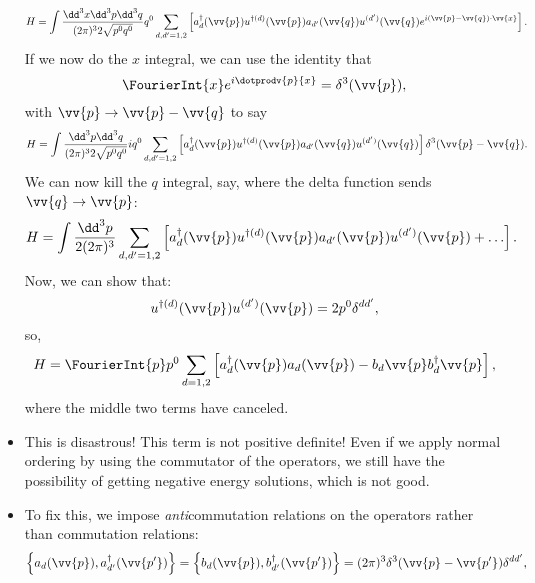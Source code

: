 \begin{itemize}
            \begin{equation*}
                H = \int\frac{\dd^3x\dd^3p\dd^3q}{(2\pi)^3 2\sqrt{p^0q^0}} q^0 \sum_{d,d'=1,2} \left[ a_d^{\dagger}(\vv{p})u^{\dagger(d)}(\vv{p}) a_{d'}(\vv{q})u^{(d')}(\vv{q})e^{i(\vv{p}-\vv{q})\cdot\vv{x}} \right].
            \end{equation*}
            If we now do the $x$ integral, we can use the identity that
            \begin{equation*}
                \FourierInt{x} e^{i\dotprodv{p}{x}} = \delta^3(\vv{p}),
            \end{equation*}
            with $\vv{p} \rightarrow \vv{p}-\vv{q}$ to say
            \begin{equation*}
                H = \int \frac{\dd^3p\dd^3q}{(2\pi)^3 2\sqrt{p^0q^0}} iq^0 \sum_{d,d'=1,2} \left[ a_d^{\dagger}(\vv{p})u^{\dagger(d)}(\vv{p})a_{d'}(\vv{q})u^{(d')}(\vv{q}) \right]\delta^3(\vv{p}-\vv{q}).
            \end{equation*}
            We can now kill the $q$ integral, say, where the delta function sends $\vv{q} \rightarrow \vv{p}$:
            \begin{equation*}
                H = \int \frac{\dd^3p}{2(2\pi)^3} \sum_{d,d'=1,2} \left[ a_d^{\dagger}(\vv{p})u^{\dagger(d)}(\vv{p})a_{d'}(\vv{p})u^{(d')}(\vv{p}) + \ldots \right].
            \end{equation*}
            Now, we can show that:
            \begin{equation*}
                u^{\dagger(d)}(\vv{p}) u^{(d')}(\vv{p}) = 2p^0\delta^{dd'},
            \end{equation*}
            so,
            \begin{equation*}
                H = \FourierInt{p} p^0 \sum_{d=1,2} \left[ a^{\dagger}_d(\vv{p})a_d(\vv{p}) - b_d{\vv{p}}b^{\dagger}_d{\vv{p}} \right],
            \end{equation*}
            where the middle two terms have canceled.
        \item This is disastrous! This term is not positive definite! Even if we apply normal ordering by using the commutator of the operators, we still have the possibility of getting negative energy solutions, which is not good.
        \item To fix this, we impose \textit{anti}commutation relations on the operators rather than commutation relations:
            \begin{equation}
                \left\{ a_d(\vv{p}),a^{\dagger}_{d'}(\vv{p'}) \right\} = \left\{ b_d(\vv{p}),b^{\dagger}_{d'}(\vv{p'}) \right\} = (2\pi)^3 \delta^3(\vv{p}-\vv{p'}) \delta^{dd'},\label{SpinorOpAnticommRels}

\end{equation}
\end{itemize}
